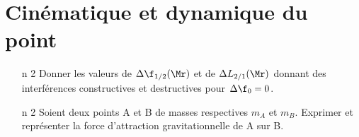 \documentclass[a4paper, 10pt, final, garamond]{book}
\begin{document}
\setcounter{chapter}{13}


\chapter{Cinématique et dynamique du point}

\begin{enumerate}[label=\sqenumi]
	\item[n]{2}%
	      Donner les valeurs de $\Delta{\f_{1/2}(\Mr)}$ et de
	      $\Delta{L_{2/1}(\Mr)}$ donnant des interférences constructives et
	      destructives
	      pour $\Delta{\f_0}=0$.
	      \smallbreak
	      \vspace{-30pt}
	      \vspace{-15pt}
	\item[n]{2}%
	      Soient deux points A et B de masses respectives $m_A$ et $m_B$. Exprimer
	      et représenter la force d'attraction gravitationnelle de A sur B.
	      \smallbreak
	      \noindent
	      \begin{minipage}{.6\linewidth}
		      \psw{
			      \vspace{-15pt}
			      \[
				      \Ff_{g,\rm A\ra B} \stm{=} -\Gc \frac{m_Am_B}{\rm AB^2}\ur
				      \qavec
				      \ur = \frac{\vvr{AB}}{\rm AB}
			      \]
			      \vspace{-15pt}
		      }
	      \end{minipage}
	      \hfill
	      \noindent
	      \begin{minipage}{.39\linewidth}
		      \begin{center}
\end{center}
\end{minipage}
\end{enumerate}
\end{document}
